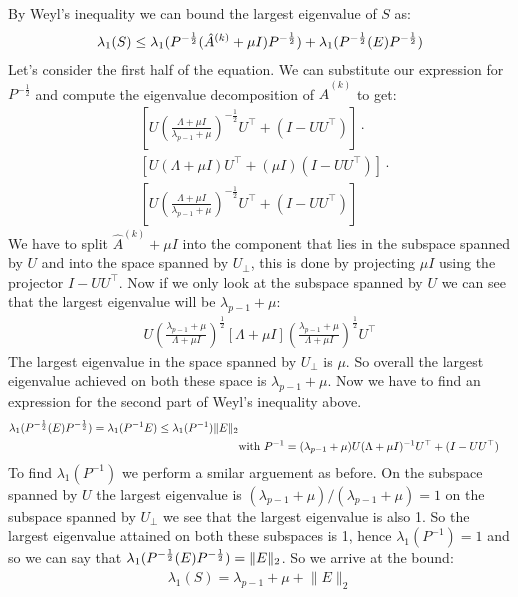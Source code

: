 By Weyl's inequality we can bound the largest eigenvalue of $S$ as:
\begin{align*}
    \lambda_1(S) \leq \lambda_1(P^{-\frac{1}{2}} (\hat{A}^{(k)} + \mu I) P^{-\frac{1}{2}}) + \lambda_1(P^{-\frac{1}{2}} (E) P^{-\frac{1}{2}})
\end{align*}
Let's consider the first half of the equation. We can substitute our expression for $P^{-\frac{1}{2}}$ and compute the eigenvalue decomposition of $\hat{A}^{(k)}$ to get:
\begin{align*}
    &\left[U\left(\frac{\Lambda + \mu I}{\lambda_{p-1} + \mu}\right)^{-\frac{1}{2}}U^{\top} + (I-UU^{\top})\right] \cdot \\
    &\left[U(\Lambda+\mu I)U^{\top} + (\mu I)(I-UU^{\top})\right] \cdot \\
    &\left[U\left(\frac{\Lambda + \mu I}{\lambda_{p-1} + \mu}\right)^{-\frac{1}{2}}U^{\top} + (I-UU^{\top})\right] 
\end{align*}
We have to split $\hat{A}^{(k)} + \mu I$ into the component that lies in the subspace spanned by $U$ and into the space
spanned by $U_{\perp}$, this is done by projecting $\mu I$ using the projector $I - UU^{\top}$. Now if we only look at
the subspace spanned by $U$ we can see that the largest eigenvalue will be $\lambda_{p-1} + \mu$:
\begin{align*}
    U(\frac{\lambda_{p-1} + \mu}{\Lambda + \mu I})^{\frac{1}{2}}[\Lambda + \mu I](\frac{\lambda_{p-1} + \mu}{\Lambda + \mu I})^{\frac{1}{2}}U^{\top}
\end{align*}
The largest eigenvalue in the space spanned by $U_{\perp}$ is $\mu$. So overall the largest eigenvalue achieved on both
these space is $\lambda_{p-1} + \mu$. Now we have to find an expression for the second part of Weyl's inequality above.
\begin{align*}
    \lambda_1(P^{-\frac{1}{2}} (E) P^{-\frac{1}{2}}) = \lambda_1(P^{-1}E) \leq \lambda_1(P^{-1})\lVert E \rVert_2 \\
    & \text{with } P^{-1} = (\lambda_{p-1}+\mu)U(\Lambda + \mu I)^{-1}U^{\top} + (I-UU^{\top})
\end{align*}
To find $\lambda_1(P^{-1})$ we perform a smilar arguement as before. On the subspace spanned by $U$ the largest
eigenvalue is $(\lambda_{p-1} + \mu) / (\lambda_{p-1} + \mu) = 1$ on the subspace spanned by $U_{\perp}$ we see that the
largest eigenvalue is also 1. So the largest eigenvalue attained on both these subspaces is 1, hence $\lambda_1(P^{-1})
= 1$ and so we can say that $\lambda_1(P^{-\frac{1}{2}} (E) P^{-\frac{1}{2}}) = \lVert E \rVert_2$. So we arrive at the bound:
\begin{align*}
    \lambda_1(S) = \lambda_{p-1} + \mu + \lVert E \rVert_2
\end{align*}
